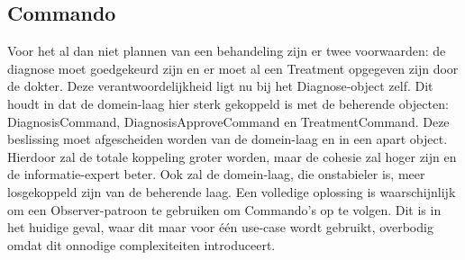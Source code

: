\subsection{Commando} 
Voor het al dan niet plannen van een behandeling zijn er twee voorwaarden: 
de diagnose moet goedgekeurd zijn en er moet al een Treatment opgegeven zijn door de dokter. 
Deze verantwoordelijkheid ligt nu bij het Diagnose-object zelf. 
Dit houdt in dat de domein-laag hier sterk gekoppeld is met de beherende objecten: DiagnosisCommand, DiagnosisApproveCommand en TreatmentCommand. 
Deze beslissing moet afgescheiden worden van de domein-laag en in een apart object. 
Hierdoor zal de totale koppeling groter worden, maar de cohesie zal hoger zijn en de informatie-expert beter. 
Ook zal de domein-laag, die onstabieler is, meer losgekoppeld zijn van de beherende laag.
Een volledige oplossing is waarschijnlijk om een Observer-patroon te gebruiken om Commando's op te volgen.
Dit is in het huidige geval, waar dit maar voor één use-case wordt gebruikt, overbodig omdat dit onnodige complexiteiten introduceert. 

